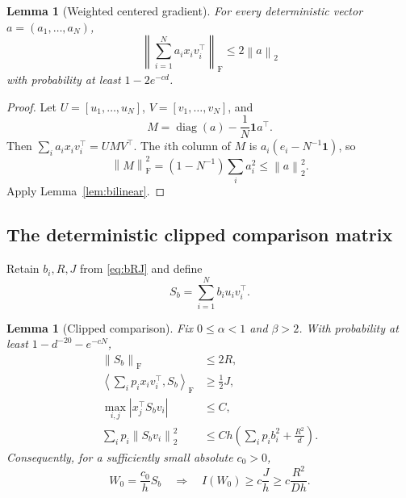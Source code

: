 \documentclass[11pt]{article}
\newtheorem{lemma}[theorem]{Lemma}
\theoremstyle{remark}
\newcommand{\ip}[2]{\left\langle #1,#2\right\rangle}
\newcommand{\norm}[1]{\left\lVert #1\right\rVert}
\newcommand{\F}{\mathrm{F}}
\newcommand{\1}{\mathbf 1}
\newcommand{\diag}{\operatorname{diag}}
\begin{document}
\begin{lemma}[Weighted centered gradient]
\label{lem:gradient}
For every deterministic vector $a=(a_1,\ldots,a_N)$,
\begin{equation}
 \norm{\sum_{i=1}^Na_ix_iv_i^\top}_{\F}
 \leq2\norm a_2
 \label{eq:gradient-bound}
\end{equation}
with probability at least $1-2e^{-cd}$.
\end{lemma}

\begin{proof}
Let $U=[u_1,\ldots,u_N]$, $V=[v_1,\ldots,v_N]$, and
\[
 M=\diag(a)-\frac1N\1 a^\top.
\]
Then $\sum_i a_ix_iv_i^\top=UMV^\top$.  The $i$th column of $M$ is
$a_i(e_i-N^{-1}\1)$, so
\[
 \norm M_{\F}^2=(1-N^{-1})\sum_i a_i^2\leq\norm a_2^2.
\]
Apply Lemma~\ref{lem:bilinear}.
\end{proof}

\subsection{The deterministic clipped comparison matrix}

Retain $b_i,R,J$ from \eqref{eq:bRJ} and define
\begin{equation}
 S_b=\sum_{i=1}^Nb_i u_iv_i^\top.
 \label{eq:Sb}
\end{equation}

\begin{lemma}[Clipped comparison]
\label{lem:comparison}
Fix $0\leq\alpha<1$ and $\beta>2$.  With probability at least
$1-d^{-20}-e^{-cN}$,
\begin{align}
 \norm{S_b}_{\F}&\leq2R,
 \label{eq:Sb-norm}\\
 \ip{\sum_i p_ix_iv_i^\top}{S_b}_{\F}&\geq\frac12J,
 \label{eq:Sb-linear}\\
 \max_{i,j}|x_j^\top S_bv_i|&\leq C,
 \label{eq:Sb-logits}\\
 \sum_i p_i\norm{S_bv_i}_2^2
 &\leq Ch\left(\sum_i p_ib_i^2+\frac{R^2}{d}\right).
 \label{eq:Sb-action}
\end{align}
Consequently, for a sufficiently small absolute $c_0>0$,
\begin{equation}
 W_0=\frac{c_0}{h}S_b
 \quad\Longrightarrow\quad
 I(W_0)\geq c\frac{J}{h}
 \geq c\frac{R^2}{Dh}.
 \label{eq:comparator-gain}
\end{equation}
\end{lemma}
\end{document}
